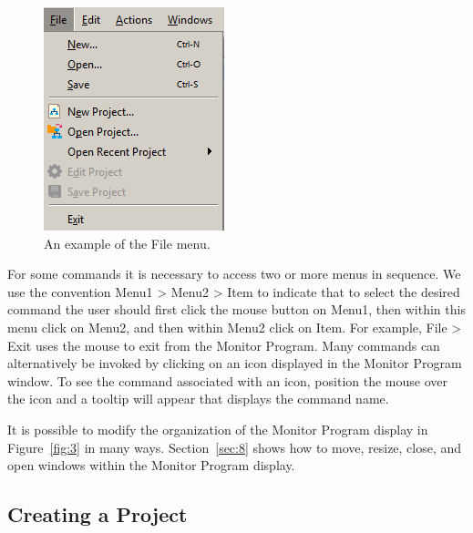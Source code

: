 \documentclass[11pt, twoside, pdftex]{article}
\begin{document}
\begin{figure}[H]
   \begin{center}
      \includegraphics[scale=.9]{screenshots/figure4.png}
   \end{center}
   \caption{An example of the {\sf File} menu.}
	 \label{fig:4}
\end{figure}

For some commands it is necessary to access two or more menus in
sequence. We use the convention {\sf Menu1 > Menu2 > Item} to
indicate that to select the desired command 
the user should first click the mouse button on {\sf Menu1}, 
then within this menu click on {\sf Menu2}, and then 
within {\sf Menu2} click on {\sf Item}. For example, 
{\sf File > Exit} uses the mouse to exit from the Monitor
Program. Many commands can alternatively be invoked 
by clicking on an icon displayed in the Monitor Program window. To see the command associated with an icon, position the mouse
over the icon and a tooltip will appear that displays 
the command name.

It is possible to modify the organization of the Monitor Program
display in Figure~\ref{fig:3} in many ways. 
Section~\ref{sec:8} shows how to move, resize, close, and open windows
within the Monitor Program display.

\subsection{Creating a Project}
\label{sec:3.1}
\end{document}

